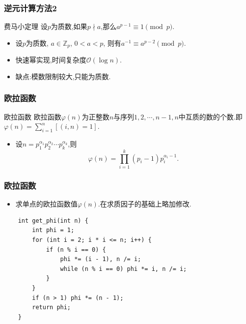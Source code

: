 \documentclass{beamer}
\newcommand{\pau}{}
\begin{document}
\begin{frame}[fragile]
    \frametitle{逆元计算方法2}
    \begin{block}{费马小定理}
        设$p$为质数,如果$p\nmid a$,那么$a^{p-1}\equiv1\pmod p$.
    \end{block} \pau
    \begin{itemize}
        \item 设$p$为质数, $a\in\mathbb{Z}_p$, $0<a<p$, 则有$a^{-1}\equiv a^{p-2}\pmod p$.\pau
        \item 快速幂实现,时间复杂度$\mathcal{O}(\log n)$. \pau
        \item 缺点:模数限制较大,只能为质数.
    \end{itemize}
\end{frame}

\begin{frame}[fragile]
    \frametitle{欧拉函数}
    \begin{block}{欧拉函数}
        欧拉函数$\varphi(n)$为正整数$n$与序列$1,2,\cdots,n-1,n$中互质的数的个数.即$\varphi(n)=\sum\limits_{i=1}^n[(i,n)=1]$.
    \end{block}\pau
    \begin{itemize}
        \item 设$n=p_1^{\alpha_1}p_2^{\alpha_2}\cdots p_k^{\alpha_k}$,则$$\varphi(n)=\prod\limits_{i=1}^k(p_i-1)p_i^{\alpha_i-1}.$$
    \end{itemize}
\end{frame}

\begin{frame}[fragile]
    \frametitle{欧拉函数}
    \begin{itemize}
        \item 求单点的欧拉函数值$\varphi(n)$.在求质因子的基础上略加修改.
    \end{itemize}\pau
    \begin{verbatim}
    int get_phi(int n) {
        int phi = 1;
        for (int i = 2; i * i <= n; i++) {
            if (n % i == 0) {
                phi *= (i - 1), n /= i;
                while (n % i == 0) phi *= i, n /= i;
            }
        }
        if (n > 1) phi *= (n - 1);
        return phi;
    }
    \end{verbatim}
\end{frame}
\end{document}
